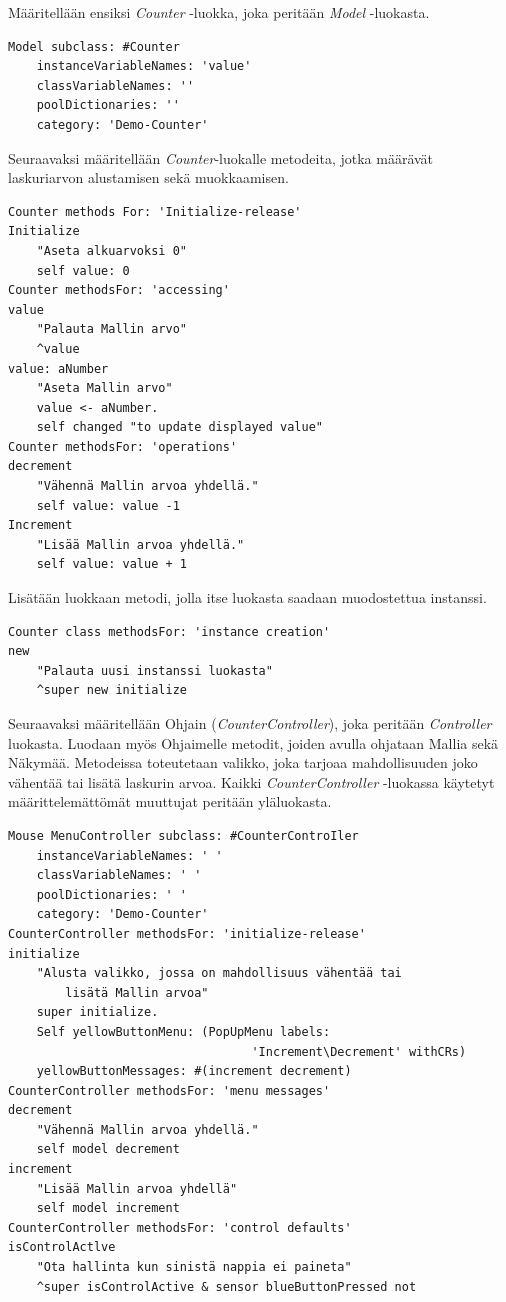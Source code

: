 \documentclass[utf8]{gradu3}
\begin{document}
Määritellään ensiksi \emph{Counter} -luokka, joka peritään \emph{Model} -luokasta.
\begin{lstlisting}[language=Smalltalk]
Model subclass: #Counter
	instanceVariableNames: 'value'
	classVariableNames: ''
	poolDictionaries: ''
  	category: 'Demo-Counter'
\end{lstlisting}
Seuraavaksi määritellään \emph{Counter}-luokalle metodeita, jotka määrävät
laskuriarvon alustamisen sekä muokkaamisen.
\begin{lstlisting}[language=Smalltalk]
Counter methods For: 'Initialize-release'
Initialize
	"Aseta alkuarvoksi 0"
	self value: 0
Counter methodsFor: 'accessing'
value
	"Palauta Mallin arvo"
   	^value
value: aNumber
	"Aseta Mallin arvo"
	value <- aNumber.
	self changed "to update displayed value"
Counter methodsFor: 'operations'
decrement
	"Vähennä Mallin arvoa yhdellä."
	self value: value -1
Increment
	"Lisää Mallin arvoa yhdellä."
	self value: value + 1
\end{lstlisting}
Lisätään luokkaan metodi, jolla itse luokasta saadaan muodostettua instanssi.
\begin{lstlisting}[language=Smalltalk]
Counter class methodsFor: 'instance creation'
new
	"Palauta uusi instanssi luokasta"
	^super new initialize
\end{lstlisting}
Seuraavaksi määritellään Ohjain (\emph{CounterController}), joka peritään
\emph{Controller} luokasta. Luodaan myös Ohjaimelle metodit, joiden avulla
ohjataan Mallia sekä Näkymää. Metodeissa toteutetaan valikko, joka tarjoaa
mahdollisuuden joko vähentää tai lisätä laskurin arvoa. Kaikki \emph{CounterController} -luokassa käytetyt
määrittelemättömät muuttujat peritään yläluokasta.
\begin{lstlisting}[language=Smalltalk]
Mouse MenuController subclass: #CounterControIler
	instanceVariableNames: ' '
  	classVariableNames: ' '
  	poolDictionaries: ' '
  	category: 'Demo-Counter'
CounterController methodsFor: 'initialize-release'
initialize
	"Alusta valikko, jossa on mahdollisuus vähentää tai 
        lisätä Mallin arvoa"
  	super initialize.
  	Self yellowButtonMenu: (PopUpMenu labels: 
                                  'Increment\Decrement' withCRs)
  	yellowButtonMessages: #(increment decrement)
CounterController methodsFor: 'menu messages'
decrement
	"Vähennä Mallin arvoa yhdellä."
 	self model decrement
increment
	"Lisää Mallin arvoa yhdellä"
	self model increment
CounterController methodsFor: 'control defaults'
isControlActlve
	"Ota hallinta kun sinistä nappia ei paineta"
	^super isControlActive & sensor blueButtonPressed not
\end{lstlisting}
\end{document}

